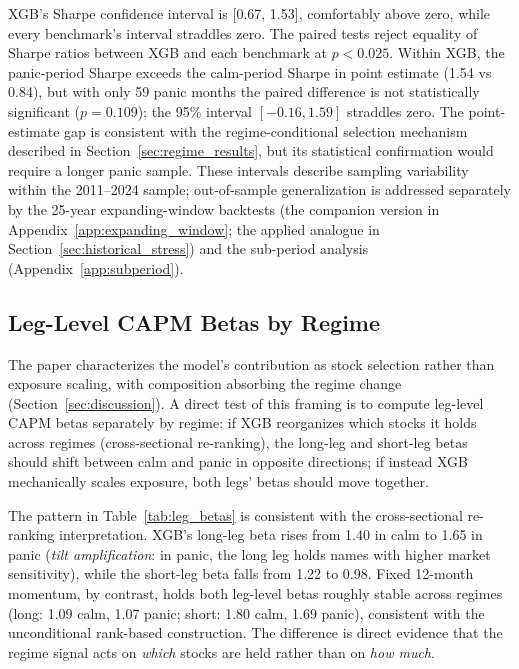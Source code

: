 

XGB's Sharpe confidence interval is [0.67, 1.53], comfortably above zero, while every benchmark's interval straddles zero. The paired tests reject equality of Sharpe ratios between XGB and each benchmark at $p < 0.025$. Within XGB, the panic-period Sharpe exceeds the calm-period Sharpe in point estimate (1.54 vs 0.84), but with only 59 panic months the paired difference is not statistically significant ($p = 0.109$); the 95\% interval $[-0.16, 1.59]$ straddles zero. The point-estimate gap is consistent with the regime-conditional selection mechanism described in Section~\ref{sec:regime_results}, but its statistical confirmation would require a longer panic sample. These intervals describe sampling variability within the 2011--2024 sample; out-of-sample generalization is addressed separately by the 25-year expanding-window backtests (the companion version in Appendix~\ref{app:expanding_window}; the applied analogue in Section~\ref{sec:historical_stress}) and the sub-period analysis (Appendix~\ref{app:subperiod}).

\subsection{Leg-Level CAPM Betas by Regime}\label{app:leg_betas}

The paper characterizes the model's contribution as stock selection rather than exposure scaling, with composition absorbing the regime change (Section~\ref{sec:discussion}). A direct test of this framing is to compute leg-level CAPM betas separately by regime: if XGB reorganizes which stocks it holds across regimes (cross-sectional re-ranking), the long-leg and short-leg betas should shift between calm and panic in opposite directions; if instead XGB mechanically scales exposure, both legs' betas should move together.



The pattern in Table~\ref{tab:leg_betas} is consistent with the cross-sectional re-ranking interpretation. XGB's long-leg beta rises from 1.40 in calm to 1.65 in panic (\emph{tilt amplification}: in panic, the long leg holds names with higher market sensitivity), while the short-leg beta falls from 1.22 to 0.98. Fixed 12-month momentum, by contrast, holds both leg-level betas roughly stable across regimes (long: 1.09 calm, 1.07 panic; short: 1.80 calm, 1.69 panic), consistent with the unconditional rank-based construction. The difference is direct evidence that the regime signal acts on \emph{which} stocks are held rather than on \emph{how much}.


